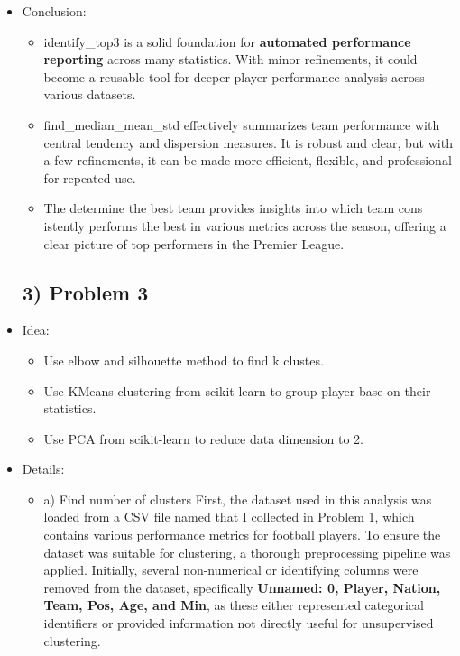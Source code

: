 \documentclass[a4paper,12pt]{article}
\begin{document}
\begin{itemize}[label= {*}, leftmargin= 1cm]
\begin{itemize}[label= {}, leftmargin= 1cm]
    \end{itemize}
    \item {\Large Conclusion:}
    \begin{itemize}[label= {-}, leftmargin= 1cm]
        \item identify\_top3 is a solid foundation for \textbf{automated performance reporting} across many statistics. With minor refinements, it could become a reusable tool for deeper player performance analysis across various datasets.
        \item find\_median\_mean\_std effectively summarizes team performance with central tendency and dispersion measures. It is robust and clear, but with a few refinements, it can be made more efficient, flexible, and professional for repeated use.
        \item The determine the best team provides insights into which team cons istently performs the best in various metrics across the season, offering a clear picture of top performers in the Premier League.
    \end{itemize}
    \newpage

    \subsection*{3) Problem 3}
    \item {\Large Idea:}
    \begin{itemize}[label= {-}, leftmargin= 1cm]
        \item Use elbow and silhouette method to find k clustes.
        \item Use KMeans clustering from scikit-learn to group player base on their statistics.
        \item Use PCA from scikit-learn to reduce data dimension to 2.
    \end{itemize}
    \item {\Large Details:}
    \begin{itemize}[label= {}, leftmargin= 1cm]
        \item a) Find number of clusters
        First, the dataset used in this analysis was loaded from a CSV file named that I collected in Problem 1, which contains various performance metrics for football players. To ensure the dataset was suitable for clustering, a thorough preprocessing pipeline was applied. Initially, several non-numerical or identifying columns were removed from the dataset, specifically \textbf{Unnamed: 0, Player, Nation, Team, Pos, Age, and Min}, as these either represented categorical identifiers or provided information not directly useful for unsupervised clustering.


\end{itemize}
\end{itemize}
\end{document}
